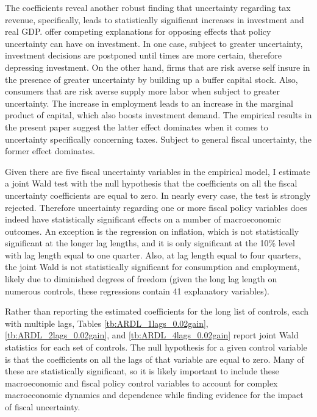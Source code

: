 \documentclass[11pt]{article}
\newcommand{\citee}[1]{\citet{#1}}
\begin{document}
The coefficients reveal another robust finding that uncertainty regarding tax revenue, specifically, leads to statistically significant increases in investment and real GDP.  \citee{born2011} offer competing explanations for opposing effects that policy uncertainty can have on investment.  In one case, subject to greater uncertainty, investment decisions are postponed until times are more certain, therefore depressing investment.  On the other hand, firms that are risk averse self insure in the presence of greater uncertainty by building up a buffer capital stock.  Also, consumers that are risk averse supply more labor when subject to greater uncertainty.  The increase in employment leads to an increase in the marginal product of capital, which also boosts investment demand.  The empirical results in the present paper suggest the latter effect dominates when it comes to uncertainty specifically concerning taxes.  Subject to general fiscal uncertainty, the former effect dominates.

Given there are five fiscal uncertainty variables in the empirical model, I estimate a joint Wald test with the null hypothesis that the coefficients on all the fiscal uncertainty coefficients are equal to zero.  In nearly every case, the test is strongly rejected. Therefore uncertainty regarding one or more fiscal policy variables does indeed have statistically significant effects on a number of macroeconomic outcomes.  An exception is the regression on inflation, which is not statistically significant at the longer lag lengths, and it is only significant at the 10\% level with lag length equal to one quarter.  Also, at lag length equal to four quarters, the joint Wald is not statistically significant for consumption and employment, likely due to diminished degrees of freedom (given the long lag length on numerous controls, these regressions contain 41 explanatory variables).

Rather than reporting the estimated coefficients for the long list of controls, each with multiple lags, Tables \ref{tb:ARDL_1lags_0.02gain}, \ref{tb:ARDL_2lags_0.02gain}, and \ref{tb:ARDL_4lags_0.02gain} report joint Wald statistics for each set of controls.  The null hypothesis for a given control variable is that the coefficients on all the lags of that variable are equal to zero.  Many of these are statistically significant, so it is likely important to include these macroeconomic and fiscal policy control variables to account for complex macroeconomic dynamics and dependence while finding evidence for the impact of fiscal uncertainty.
\end{document}
